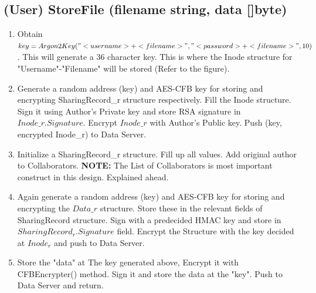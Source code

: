 \documentclass[a4paper, 12pt]{scrartcl}
\begin{document}
\subsection{(User) StoreFile (filename string, data []byte)}
\begin{enumerate}
	\itemsep0em
	\item Obtain $key = Argon2Key("<username>+<filename>", "<password>+<filename>", 10)$. This will generate a 36 character key. This is where the Inode structure for "Username"-"Filename" will be stored (Refer to the figure).
	\item Generate a random address (key) and AES-CFB key for storing and encrypting SharingRecord\_r structure respectively. Fill the Inode structure. Sign it using Author's Private key and store RSA signature in $Inode\_r.Signature$. Encrypt $Inode\_r$ with Author's Public key. Push (key, encrypted Inode\_r) to Data Server.
	\item Initialize a SharingRecord\_r structure. Fill up all values. Add original author to Collaborators. \textbf{NOTE:} The List of Collaborators is most important construct in this design. Explained ahead.
	\item Again generate a random address (key) and AES-CFB key for storing and encrypting the $Data\_r$ structure. Store these in the relevant fields of SharingRecord structure. Sign with a predecided HMAC key and store in $SharingRecord_r.Signature$ field. Encrypt the Structure with the key decided at $Inode_r$ and push to Data Server.
	\item Store the "data" at The key generated above, Encrypt it with CFBEncrypter() method. Sign it and store the data at the "key". Push to Data Server and return. 
\end{enumerate}
\end{document}
